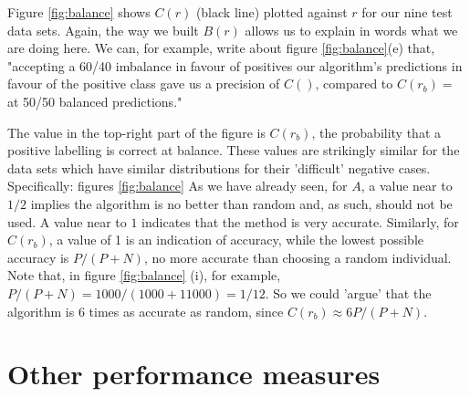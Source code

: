 \documentclass{article}
\begin{document}
Figure \ref{fig:balance} shows $C(r)$ (black line) plotted against $r$ for our nine test data sets. Again, the way we built $B(r)$ allows us to explain in words what we are doing here. We can, for example, write about figure \ref{fig:balance}(e) that, "accepting a 60/40 imbalance in favour of positives our algorithm's predictions in favour of the positive class gave us a precision of $C()$, compared to $C(r_b)=$ at 50/50 balanced predictions." 

 The value in the top-right part of the figure is $C(r_b)$, the probability that a positive labelling is correct at balance. These values are strikingly similar for the data sets which have similar distributions for their 'difficult' negative cases. Specifically: figures \ref{fig:balance} 
As we have already seen, for $A$, a value near to $1/2$ implies the algorithm is no better than random and, as such, should not be used. A value near to $1$ indicates that the method is very accurate. Similarly, for $C(r_b)$, a value of 1 is an indication of accuracy, while the lowest possible accuracy is $P/(P+N)$, no more accurate than choosing a random individual. Note that, in figure \ref{fig:balance} (i), for example,  $P/(P+N)=1000/(1000+11000)=1/12$. So we could 'argue' that the algorithm is 6 times as accurate as random, since $C(r_b) \approx 6 P/(P+N)$. 



\section{Other performance measures}
\end{document}
